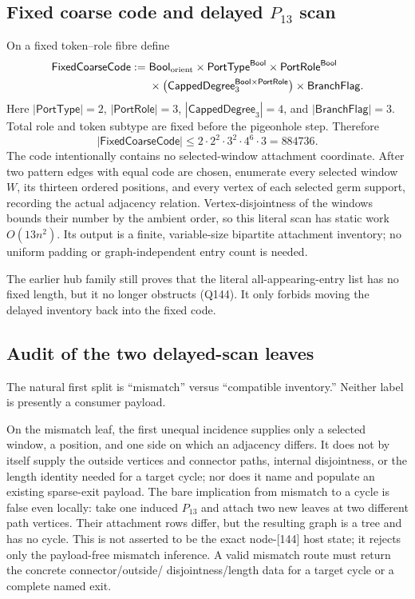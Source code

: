 \documentclass[11pt]{article}
\begin{document}
\subsection*{Fixed coarse code and delayed $P_{13}$ scan}
On a fixed token--role fibre define
\[
\begin{split}
 \mathsf{FixedCoarseCode}:={}&
 \mathsf{Bool}_{\rm orient}
 \times \mathsf{PortType}^{\mathsf{Bool}}
 \times \mathsf{PortRole}^{\mathsf{Bool}}\\
 &\times
 \bigl(\mathsf{CappedDegree}_3^{
          \mathsf{Bool}\times\mathsf{PortRole}}\bigr)
 \times \mathsf{BranchFlag}.
\end{split}
\]
Here $|\mathsf{PortType}|=2$, $|\mathsf{PortRole}|=3$,
$|\mathsf{CappedDegree}_3|=4$, and
$|\mathsf{BranchFlag}|=3$.  Total role and token subtype are fixed before the
pigeonhole step.  Therefore
\[
 |\mathsf{FixedCoarseCode}|
 \le 2\cdot2^2\cdot3^2\cdot4^6\cdot3=884736.          \tag{Q144}
\]
The code intentionally contains no selected-window attachment coordinate.
After two pattern edges with equal code are chosen, enumerate every selected
window $W$, its thirteen ordered positions, and every vertex of each selected
germ support, recording the actual adjacency relation.  Vertex-disjointness of
the windows bounds their number by the ambient order, so this literal scan has
static work $O(13n^2)$.  Its output is a finite, variable-size bipartite
attachment inventory; no uniform padding or graph-independent entry count is
needed.

The earlier hub family still proves that the literal all-appearing-entry list
has no fixed length, but it no longer obstructs (Q144).  It only forbids moving
the delayed inventory back into the fixed code.

\subsection*{Audit of the two delayed-scan leaves}
The natural first split is ``mismatch'' versus ``compatible inventory.''
Neither label is presently a consumer payload.

On the mismatch leaf, the first unequal incidence supplies only a selected
window, a position, and one side on which an adjacency differs.  It does not
by itself supply the outside vertices and connector paths, internal
disjointness, or the length identity needed for a target cycle; nor does it
name and populate an existing sparse-exit payload.  The bare implication from
mismatch to a cycle is false even locally: take one induced $P_{13}$ and attach
two new leaves at two different path vertices.  Their attachment rows differ,
but the resulting graph is a tree and has no cycle.  This is not asserted to be
the exact node-[144] host state; it rejects only the payload-free mismatch
inference.  A valid mismatch route must return the concrete connector/outside/
disjointness/length data for a target cycle or a complete named exit.
\end{document}
